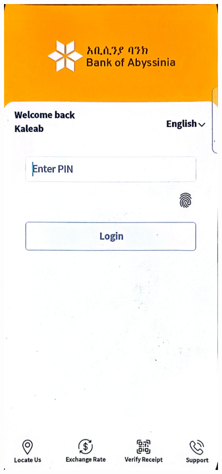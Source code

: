 \documentclass[a4paper,12pt]{report}
\begin{document}
\begin{figure}[h]
  \centering
  \begin{minipage}[b]{0.3\textwidth}
    \includegraphics[width=\linewidth]{../images/screenshots/bank-of-abyssinia/boa_sign-in.jpg}

\end{minipage}
\end{figure}
\end{document}
